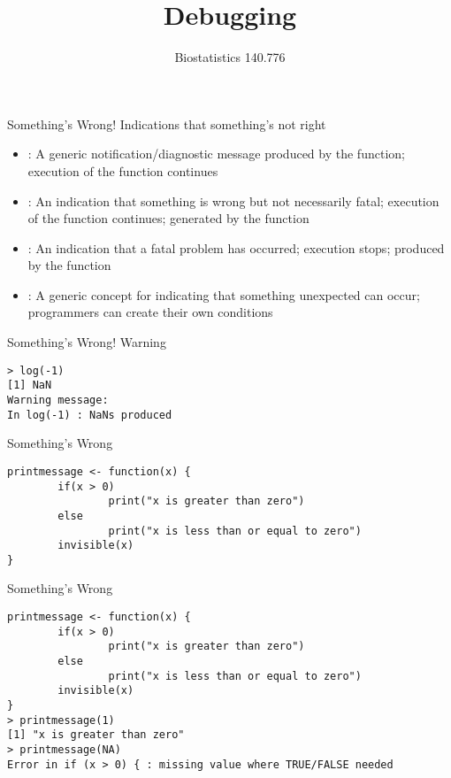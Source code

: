 \documentclass[aspectratio=169]{beamer}
\title[Debugging]{Debugging}
\date{Biostatistics 140.776}
\begin{document}
\begin{frame}
  \titlepage
\end{frame}


\begin{frame}{Something's Wrong!}
Indications that something's not right
\begin{itemize}
\item {}: A generic notification/diagnostic message
  produced by the  function; execution of the function
  continues
\item {}: An indication that something is wrong but not
  necessarily fatal; execution of the function continues; generated by
  the  function
\item {}: An indication that a fatal problem has occurred;
  execution stops; produced by the  function
\item {}: A generic concept for indicating that
  something unexpected can occur; programmers can create their own
  conditions
\end{itemize}
\end{frame}

\begin{frame}[fragile]{Something's Wrong!}
Warning
\begin{verbatim}
> log(-1)
[1] NaN
Warning message:
In log(-1) : NaNs produced
\end{verbatim}
\end{frame}

\begin{frame}[fragile]{Something's Wrong}
\begin{verbatim}
printmessage <- function(x) {
        if(x > 0)
                print("x is greater than zero")
        else 
                print("x is less than or equal to zero")
        invisible(x)
}
\end{verbatim}
\end{frame}

\begin{frame}[fragile]{Something's Wrong}
\begin{verbatim}
printmessage <- function(x) {
        if(x > 0)
                print("x is greater than zero")
        else 
                print("x is less than or equal to zero")
        invisible(x)
}
> printmessage(1)
[1] "x is greater than zero"
> printmessage(NA)
Error in if (x > 0) { : missing value where TRUE/FALSE needed
\end{verbatim}
\end{frame}
\end{document}
